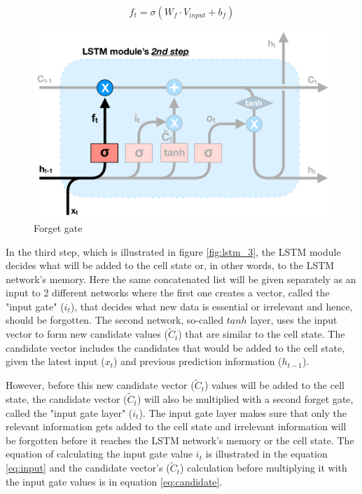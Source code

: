 \begin{equation} \label{eq:forget}
    f_t = \sigma ( W_f \cdot V_{input} + b_f)
\end{equation}

\begin{figure}[h]
    \centering
    \includegraphics[width=12cm,height=\textheight,keepaspectratio]{lstm_2}
    \caption{Forget gate}
    \label{fig:lstm_2}
\end{figure}


In the third step, which is illustrated in figure \ref{fig:lstm_3}, the LSTM module decides what will be added to the cell state or, in other words, to the LSTM network's memory. Here the same concatenated list will be given separately as an input to 2 different networks where the first one creates a vector, called the "input gate" ($i_t$), that decides what new data is essential or irrelevant and hence, should be forgotten. The second network, so-called $tanh$ layer, uses the input vector to form new candidate values ($\widetilde{C}_t$) that are similar to the cell state. The candidate vector includes the candidates that would be added to the cell state, given the latest input ($x_t$) and previous prediction information ($h_{t-1}$). 

However, before this new candidate vector ($\widetilde{C}_t$) values will be added to the cell state, the candidate vector ($\widetilde{C}_t$) will also be multiplied with a second forget gate, called the "input gate layer" ($i_t$). The input gate layer makes sure that only the relevant information gets added to the cell state and irrelevant information will be forgotten before it reaches the LSTM network's memory or the cell state. The equation of calculating the input gate value $i_t$ is illustrated in the equation \ref{eq:input} and the candidate vector's ($\widetilde{C}_t$) calculation before multiplying it with the input gate values is in equation \ref{eq:candidate}.

